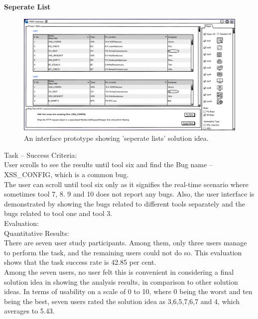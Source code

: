 \textbf{Seperate List}
\begin{figure}[hbt!]
	\centering
	\includegraphics[width=\linewidth]{figures/solution_ideas_snaps/S21_seperate_lists}
	\caption{An interface prototype showing 'seperate lists' solution idea.}
	\label{fig:S21_seperate_lists}
\end{figure}

Task – Success Criteria: \\

User scrolls to see the results until tool six and find the Bug name – XSS\_CONFIG, which is a common bug. \\

The user can scroll until tool six only as it signifies the real-time scenario where sometimes tool 7, 8. 9 and 10 does not report any bugs. Also, the user interface is demonstrated by showing the bugs related to different tools separately and the bugs related to tool one and tool 3. \\
\clearpage
Evaluation: \\

Quantitative Results: \\

There are seven user study participants. Among them, only three users manage to perform the task, and the remaining users could not do so. This evaluation shows that the task success rate is 42.85 per cent. \\

Among the seven users, no user felt this is convenient in considering a final solution idea in showing the analysis results, in comparison to other solution ideas. In terms of usability on a scale of 0 to 10, where 0 being the worst and ten being the best, seven users rated the solution idea as 3,6,5,7,6,7 and 4, which averages to 5.43. \\

